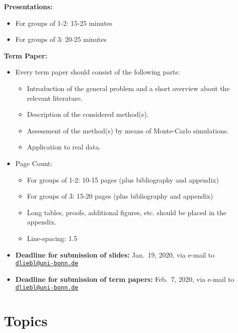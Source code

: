 \documentclass[
]{book}
\providecommand{\tightlist}{%
  \setlength{\itemsep}{0pt}\setlength{\parskip}{0pt}}
\begin{document}
\hfill\break

\textbf{Presentations:}

\begin{itemize}
\tightlist
\item
  For groups of 1-2: 15-25 minutes
\item
  For groups of 3: 20-25 minutes
\end{itemize}

\hfill\break

\textbf{Term Paper:}

\begin{itemize}
\tightlist
\item
  Every term paper should consist of the following parts:

  \begin{itemize}
  \tightlist
  \item
    Introduction of the general problem and a short overview about the relevant literature.
  \item
    Description of the considered method(s).
  \item
    Assessment of the method(s) by means of Monte-Carlo simulations.
  \item
    Application to real data.
  \end{itemize}
\item
  Page Count:

  \begin{itemize}
  \tightlist
  \item
    For groups of 1-2: 10-15 pages (plus bibliography and appendix)
  \item
    For groups of 3: 15-20 pages (plus bibliography and appendix)
  \item
    Long tables, proofs, additional figures, etc. should be placed in the appendix.
  \item
    Line-spacing: 1.5
  \end{itemize}
\item
  \textbf{Deadline for submission of slides:} Jan.~19, 2020, via e-mail to \href{mailto:dliebl@uni-bonn.de}{\nolinkurl{dliebl@uni-bonn.de}}\\
\item
  \textbf{Deadline for submission of term papers:} Feb.~7, 2020, via e-mail to \href{mailto:dliebl@uni-bonn.de}{\nolinkurl{dliebl@uni-bonn.de}}
\end{itemize}

\hypertarget{topics}{%
\chapter*{Topics}\label{topics}}
\end{document}
